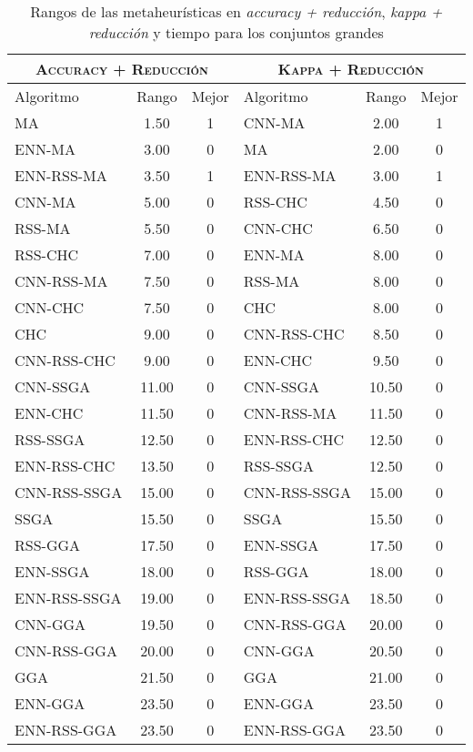 \begin{table}[]
\centering
\begin{adjustbox}{max width =\textwidth}
\begin{tabular}{l c c|l c c}
\hline
\multicolumn{3}{c|}{\textsc{Accuracy + Reducción}}
	& \multicolumn{3}{c}{\textsc{Kappa + Reducción}} \\
\hline
Algoritmo & Rango & Mejor & Algoritmo & Rango & Mejor \\
\hline
\hline

MA           & 1.50  & 1 & CNN-MA       & 2.00  & 1 \\
ENN-MA       & 3.00  & 0 & MA           & 2.00  & 0 \\
ENN-RSS-MA   & 3.50  & 1 & ENN-RSS-MA   & 3.00  & 1 \\
CNN-MA       & 5.00  & 0 & RSS-CHC      & 4.50  & 0 \\
RSS-MA       & 5.50  & 0 & CNN-CHC      & 6.50  & 0 \\
RSS-CHC      & 7.00  & 0 & ENN-MA       & 8.00  & 0 \\
CNN-RSS-MA   & 7.50  & 0 & RSS-MA       & 8.00  & 0 \\
CNN-CHC      & 7.50  & 0 & CHC          & 8.00  & 0 \\
CHC          & 9.00  & 0 & CNN-RSS-CHC  & 8.50  & 0 \\
CNN-RSS-CHC  & 9.00  & 0 & ENN-CHC      & 9.50  & 0 \\
CNN-SSGA     & 11.00 & 0 & CNN-SSGA     & 10.50 & 0 \\
ENN-CHC      & 11.50 & 0 & CNN-RSS-MA   & 11.50 & 0 \\
RSS-SSGA     & 12.50 & 0 & ENN-RSS-CHC  & 12.50 & 0 \\
ENN-RSS-CHC  & 13.50 & 0 & RSS-SSGA     & 12.50 & 0 \\
CNN-RSS-SSGA & 15.00 & 0 & CNN-RSS-SSGA & 15.00 & 0 \\
SSGA         & 15.50 & 0 & SSGA         & 15.50 & 0 \\
RSS-GGA      & 17.50 & 0 & ENN-SSGA     & 17.50 & 0 \\
ENN-SSGA     & 18.00 & 0 & RSS-GGA      & 18.00 & 0 \\
ENN-RSS-SSGA & 19.00 & 0 & ENN-RSS-SSGA & 18.50 & 0 \\
CNN-GGA      & 19.50 & 0 & CNN-RSS-GGA  & 20.00 & 0 \\
CNN-RSS-GGA  & 20.00 & 0 & CNN-GGA      & 20.50 & 0 \\
GGA          & 21.50 & 0 & GGA          & 21.00 & 0 \\
ENN-GGA      & 23.50 & 0 & ENN-GGA      & 23.50 & 0 \\
ENN-RSS-GGA  & 23.50 & 0 & ENN-RSS-GGA  & 23.50 & 0 \\

\hline
\end{tabular}
\end{adjustbox}
\caption{Rangos de las metaheurísticas en \emph{accuracy + reducción}, \emph{kappa + reducción} y tiempo para los conjuntos grandes}
\label{rank-large}
\end{table}

